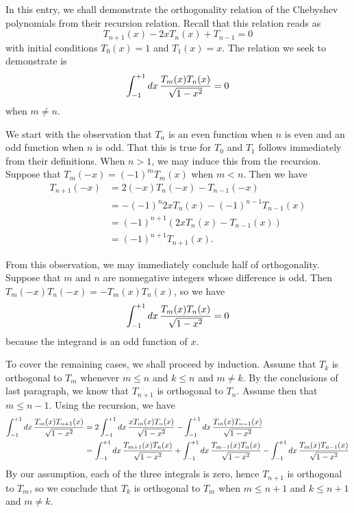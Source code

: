 \documentclass[12pt]{article}
\begin{document}
In this entry, we shall demonstrate the orthogonality
relation of the Chebyshev polynomials from their
recursion relation.  Recall that this relation reads as
\[
 T_{n+1} (x) - 2 x T_n (x) + T_{n-1} = 0
\]
with initial conditions $T_0 (x) = 1$ and $T_1 (x) = x$.
The relation we seek to demonstrate is
\[
 \int_{-1}^{+1} dx \, 
   {T_m (x) T_n (x) \over \sqrt {1 - x^2}} = 0
\]
when $m \neq n$.

We start with the observation that $T_n$ is an even function
when $n$ is even and an odd function when $n$ is odd.  That
this is true for $T_0$ and $T_1$ follows immediately from their
definitions.  When $n > 1$, we may induce this from the 
recursion.  Suppose that $T_m (-x) = (-1)^m T_m (x)$ when 
$m < n$. Then we have
\begin{align*}
 T_{n+1} (-x) &=
  2 (-x) T_n (-x) - T_{n-1} (-x) \\ &=
  - (-1)^{n} 2 x T_n (x) - (-1)^{n-1} T_{n-1} (x) \\ &=
  (-1)^{n+1} (2 x T_n (x) - T_{n-1} (x)) \\ &=
  (-1)^{n+1} T_{n+1} (x) .
\end{align*}

From this observation, we may immediately conclude half
of orthogonality.  Suppose that $m$ and $n$ are nonnegative
integers whose difference is odd.  Then $T_m (-x) T_n (-x) 
= - T_m (x) T_n (x)$, so we have
\[
 \int_{-1}^{+1} dx \, 
   {T_m (x) T_n (x) \over \sqrt {1 - x^2}} = 0
\]
because the integrand is an odd function of $x$.

To cover the remaining cases, we shall proceed by induction.
Assume that $T_k$ is orthogonal to $T_m$ whenever $m \le n$
and $k \le n$ and $m \neq k$.  By the conclusions of last 
paragraph, we know that $T_{n+1}$ is orthogonal to $T_n$.  
Assume then that $m \le n-1$.  Using the recursion, we have
\begin{align*}
 \int_{-1}^{+1} dx \, 
  {T_m (x) T_{n+1} (x) \over \sqrt {1 - x^2}} &=
 2 \int_{-1}^{+1} dx \, 
  {x T_m (x) T_{n} (x) \over \sqrt {1 - x^2}} -
 \int_{-1}^{+1} dx \, 
  {T_m (x) T_{n-1} (x) \over \sqrt {1 - x^2}} \\ &=
 \int_{-1}^{+1} dx \, 
  {T_{m+1} (x) T_{n} (x) \over \sqrt {1 - x^2}} +
 \int_{-1}^{+1} dx \, 
  {T_{m-1} (x) T_{n} (x) \over \sqrt {1 - x^2}} -
 \int_{-1}^{+1} dx \, 
  {T_m (x) T_{n-1} (x) \over \sqrt {1 - x^2}}
\end{align*}
By our assumption, each of the three integrals is zero,
hence $T_{n+1}$ is orthogonal to $T_m$, so we conclude
that $T_k$ is orthogonal to $T_m$ when $m \le n+1$ and
$k \le n+1$ and $m \neq k$.
\end{document}
